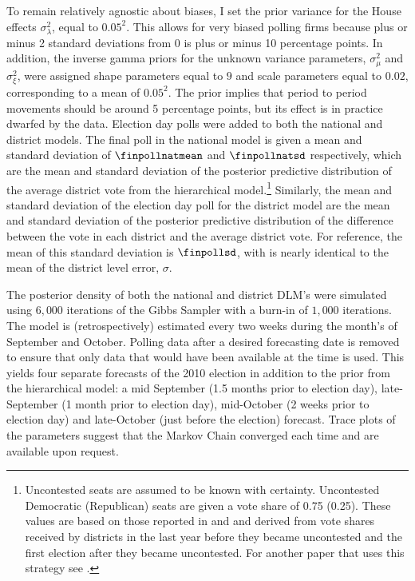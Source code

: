 \documentclass[12pt,final,fleqn]{article}
\theoremstyle{plain}
\begin{document}
To remain relatively agnostic about biases, I set the prior variance for the House effects $\sigma^2_\lambda$, equal to $0.05^2$. This allows for very biased polling firms because plus or minus 2 standard deviations from $0$ is plus or minus 10 percentage points. In addition, the inverse gamma priors for the unknown variance parameters, $\sigma_\mu^2$ and $\sigma_\xi^2$, were assigned shape parameters equal to $9$ and scale parameters equal to $0.02$, corresponding to a mean of $0.05^2$. The prior implies that period to period movements should be around 5 percentage points, but its effect is in practice dwarfed by the data. Election day polls were added to both the national and district models. The final poll in the national model is given a mean and standard deviation of $\finpollnatmean$ and  $\finpollnatsd$ respectively, which are the mean and standard deviation of the posterior predictive distribution of the average district vote from the hierarchical model.\footnote{Uncontested seats are assumed to be known with certainty. Uncontested Democratic (Republican) seats are given a vote share of 0.75 (0.25). These values are based on those reported in \citet{king1991systemic} and \citet{gelman1994unified} and derived from vote shares received by districts in the last year before they became uncontested and the first election after they became uncontested. For another paper that uses this strategy see \citet{kastellec2008predicting}.} Similarly, the mean and standard deviation of the election day poll for the district model are the mean and standard deviation of the posterior predictive distribution of the difference between the vote in each district and the average district vote. For reference, the mean of this standard deviation is $\finpollsd$, with is nearly identical to the mean of the district level error, $\sigma$.

The posterior density of both the national and district DLM's were simulated using $6,000$ iterations of the Gibbs Sampler with a burn-in of $1,000$ iterations. The model is (retrospectively) estimated every two weeks during the month's of September and October. Polling data after a desired forecasting date is removed to ensure that only data that would have been available at the time is used. This yields four separate forecasts of the 2010 election in addition to the prior from the hierarchical model: a mid September (1.5 months prior to election day), late-September (1 month prior to election day), mid-October (2 weeks prior to election day) and late-October (just before the election) forecast. Trace plots of the parameters suggest that the Markov Chain converged each time and are available upon request.
\end{document}
